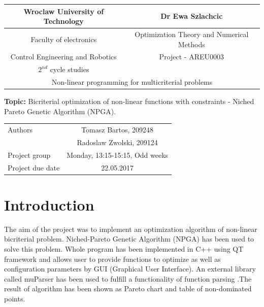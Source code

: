 \documentclass[11pt]{article}
\begin{document}
\renewcommand*\contentsname{Table of contents}
	\begin{center}
		\begin{tabular}{| c | c |}
		\hline
		Wroclaw University of Technology & Dr Ewa Szlachcic\\ \hline
		Faculty of electronics & Optimization Theory and
		Numerical Methods \\
		Control Engineering and Robotics & Project - AREU0003\\
		$2^{nd}$ cycle studies & \\ \hline
		\multicolumn{2}{c}{Non-linear programming for multicriterial problems}\\
			\hline
	\end{tabular}			
	\end{center}
	
	\textbf{Topic:} Bicriterial optimization of non-linear functions with
	constraints - Niched Pareto Genetic Algorithm (NPGA).
	
	\begin{center}
		\begin{tabular}{| l | c |}
		\hline
		Authors & Tomasz Bartos, 209248\\
				& Radoslaw Zwolski, 209124\\ \hline
		Project group & Monday, 13:15-15:15, Odd weeks\\ \hline
		Project due date & 22.05.2017\\
		\hline
	\end{tabular}
	\end{center}
	
	\newpage
	
	\tableofcontents
	
	\newpage

	\section{Introduction}
	
	The aim of the project was to implement an optimization algorithm of non-linear
	bicriterial problem. Niched-Pareto Genetic Algorithm (NPGA) has been used to
	solve this problem. Whole program has been implemented in C++ using QT 	
	framework and allows user to provide functions to optimize as well 
	as configuration parameters by GUI (Graphical User Interface). An external
	library called muParser has been used to fulfill a functionality of
	function parsing .The result of algorithm has been shown as Pareto chart and
	table of non-dominated points.
	
\end{document}
